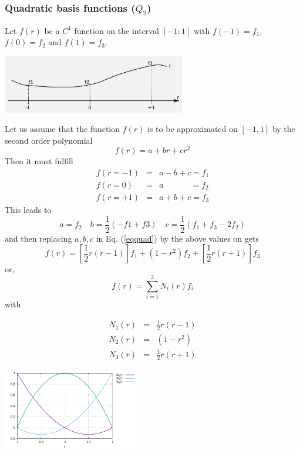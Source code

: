\subsubsection{Quadratic basis functions ($Q_2$)}

Let $f(r)$ be a $C^1$ function on the interval $[-1:1]$ with $f(-1)=f_1$, $f(0)=f_2$ and $f(1)=f_3$.
\begin{center}
\includegraphics[width=8cm]{images/quadshapefct.png}
\end{center}

Let us assume that the function $f(r)$ is to be approximated on $[-1,1]$ by the second order polynomial
\begin{equation}
f(r)=a+br+cr^2 \label{eqquad}
\end{equation}
Then it must fulfill
\begin{eqnarray}
f(r=-1)&=&a-b+c = f_1 \nonumber\\
f(r=0) &=&a\quad\quad\quad\;     = f_2 \nonumber\\
f(r=+1)&=&a+b+c = f_3 \nonumber
\end{eqnarray}
This leads to
\[
a=f_2 
\quad
b=\frac{1}{2}(-f1+f3)
\quad
c=\frac{1}{2}(f_1+f_3-2f_2)
\]
and then replacing $a,b,c$ in Eq. (\ref{eqquad}) by the above values on gets
\[
f(r)=\left[\frac{1}{2}r(r-1)\right] f_1 + (1-r^2) f_2 + \left[\frac{1}{2}r(r+1)\right] f_3
\]
or,
\[
f(r) = \sum_{i=1}^3 N_i(r) f_i
\]
with
\begin{mdframed}[backgroundcolor=blue!5]
\begin{eqnarray}
N_1(r) &=& \frac{1}{2}r(r-1) \nonumber\\
N_2(r) &=& (1-r^2) \nonumber\\ 
N_3(r) &=& \frac{1}{2}r(r+1) 
\end{eqnarray}
\end{mdframed}

\begin{center}
\includegraphics[width=6cm]{images/basis1D/quadratic.pdf}
\end{center}


